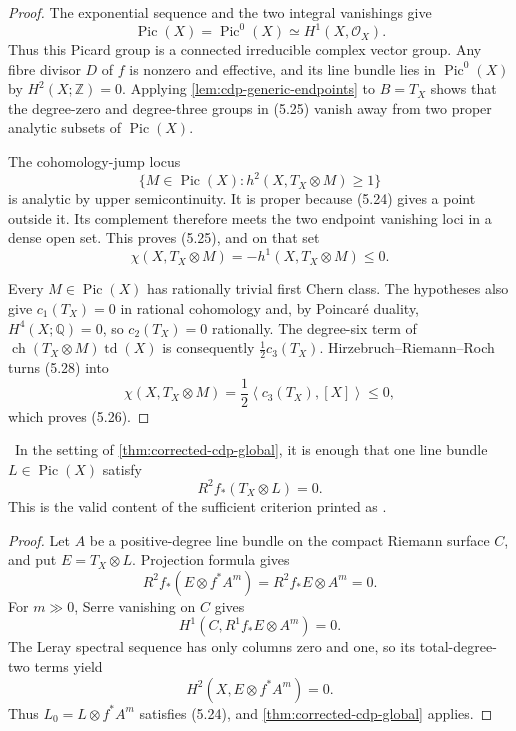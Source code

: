 \begin{proof}
The exponential sequence and the two integral vanishings give
\[
 \operatorname{Pic}(X)=\operatorname{Pic}^0(X)
 \simeq H^1(X,\mathcal O_X).
\tag{5.27}
\]
Thus this Picard group is a connected irreducible complex vector group.  Any fibre divisor \(D\) of
\(f\) is nonzero and effective, and its line bundle lies in
\(\operatorname{Pic}^0(X)\) by \(H^2(X;\mathbb Z)=0\).  Applying
\cref{lem:cdp-generic-endpoints} to \(B=T_X\) shows that the degree-zero and
degree-three groups in (5.25) vanish away from two proper analytic subsets
of \(\operatorname{Pic}(X)\).

The cohomology-jump locus
\[
 \{M\in\operatorname{Pic}(X):h^2(X,T_X\otimes M)\ge1\}
\]
is analytic by upper semicontinuity.  It is proper because (5.24) gives a
point outside it.  Its complement therefore meets the two endpoint
vanishing loci in a dense open set.  This proves (5.25), and on that set
\[
 \chi(X,T_X\otimes M)=-h^1(X,T_X\otimes M)\le0.
\tag{5.28}
\]

Every \(M\in\operatorname{Pic}(X)\) has rationally trivial first Chern
class.  The hypotheses also give \(c_1(T_X)=0\) in rational cohomology and,
by Poincar\'e duality, \(H^4(X;\mathbb Q)=0\), so
\(c_2(T_X)=0\) rationally.  The degree-six term of
\(\operatorname{ch}(T_X\otimes M)\operatorname{td}(X)\) is consequently
\(\tfrac12c_3(T_X)\).  Hirzebruch--Riemann--Roch turns (5.28) into
\[
 \chi(X,T_X\otimes M)
 =\frac12\left\langle c_3(T_X),[X]\right\rangle\le0,
\]
which proves (5.26).
\end{proof}

\begin{corollary}\label{cor:corrected-cdp-relative}
\Verified\ In the setting of
\cref{thm:corrected-cdp-global}, it is enough that one line bundle
\(L\in\operatorname{Pic}(X)\) satisfy
\[
 R^2f_*(T_X\otimes L)=0.
\tag{5.29}
\]
This is the valid content of the sufficient criterion printed as
\cite[Proposition~2.4, p.~680]{CDP2020}.
\end{corollary}

\begin{proof}
Let \(A\) be a positive-degree line bundle on the compact Riemann surface
\(C\), and put \(E=T_X\otimes L\).  Projection formula gives
\[
 R^2f_*(E\otimes f^*A^m)=R^2f_*E\otimes A^m=0.
\]
For \(m\gg0\), Serre vanishing on \(C\) gives
\[
 H^1(C,R^1f_*E\otimes A^m)=0.
\]
The Leray spectral sequence has only columns zero and one, so its
total-degree-two terms yield
\[
 H^2(X,E\otimes f^*A^m)=0.
\]
Thus \(L_0=L\otimes f^*A^m\) satisfies (5.24), and
\cref{thm:corrected-cdp-global} applies.
\end{proof}

